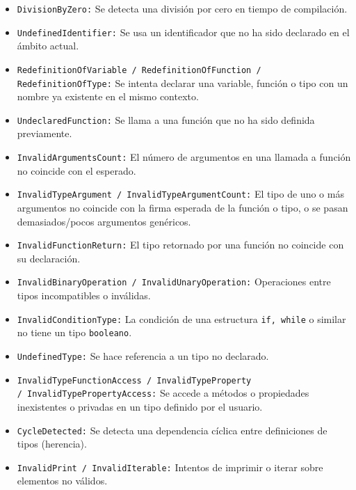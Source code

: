 \documentclass{article}
\begin{document}
\begin{itemize}
    \item \texttt{DivisionByZero:} Se detecta una división por cero en tiempo de compilación.

    \item \texttt{UndefinedIdentifier:} Se usa un identificador que no ha sido declarado en el ámbito actual.

    \item \texttt{RedefinitionOfVariable / RedefinitionOfFunction / RedefinitionOfType:} Se intenta declarar una variable, función o tipo con un nombre ya existente en el mismo contexto.

    \item \texttt{UndeclaredFunction:} Se llama a una función que no ha sido definida previamente.

    \item \texttt{InvalidArgumentsCount:} El número de argumentos en una llamada a función no coincide con el esperado.

    \item \texttt{InvalidTypeArgument / InvalidTypeArgumentCount:} El tipo de uno o más argumentos no coincide con la firma esperada de la función o tipo, o se pasan demasiados/pocos argumentos genéricos.

    \item \texttt{InvalidFunctionReturn:} El tipo retornado por una función no coincide con su declaración.

    \item \texttt{InvalidBinaryOperation / InvalidUnaryOperation:} Operaciones entre tipos incompatibles o inválidas.

    \item \texttt{InvalidConditionType:} La condición de una estructura \texttt{if, while} o similar no tiene un tipo \texttt{booleano}.

    \item \texttt{UndefinedType:} Se hace referencia a un tipo no declarado.

    \item \texttt{InvalidTypeFunctionAccess / InvalidTypeProperty\\ / InvalidTypePropertyAccess:} Se accede a métodos o propiedades inexistentes o privadas en un tipo definido por el usuario.

    \item \texttt{CycleDetected:} Se detecta una dependencia cíclica entre definiciones de tipos (herencia).

    \item \texttt{InvalidPrint / InvalidIterable:} Intentos de imprimir o iterar sobre elementos no válidos.
\end{itemize}
\end{document}
